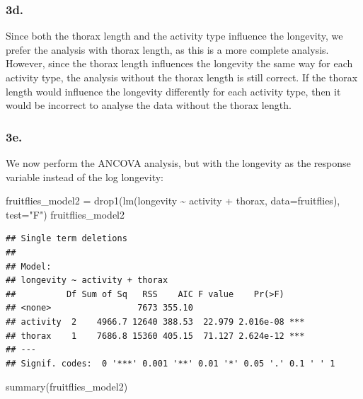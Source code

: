 \documentclass[
]{article}
\newenvironment{Shaded}{\begin{snugshade}}{\end{snugshade}}
\newcommand{\AttributeTok}[1]{\textcolor[rgb]{0.77,0.63,0.00}{#1}}
\newcommand{\FunctionTok}[1]{\textcolor[rgb]{0.00,0.00,0.00}{#1}}
\newcommand{\NormalTok}[1]{#1}
\newcommand{\OtherTok}[1]{\textcolor[rgb]{0.56,0.35,0.01}{#1}}
\newcommand{\SpecialCharTok}[1]{\textcolor[rgb]{0.00,0.00,0.00}{#1}}
\newcommand{\StringTok}[1]{\textcolor[rgb]{0.31,0.60,0.02}{#1}}
\begin{document}
\hypertarget{d.}{%
\subsubsection{3d.}\label{d.}}

Since both the thorax length and the activity type influence the
longevity, we prefer the analysis with thorax length, as this is a more
complete analysis. However, since the thorax length influences the
longevity the same way for each activity type, the analysis without the
thorax length is still correct. If the thorax length would influence the
longevity differently for each activity type, then it would be incorrect
to analyse the data without the thorax length.

\hypertarget{e.}{%
\subsubsection{3e.}\label{e.}}

We now perform the ANCOVA analysis, but with the longevity as the
response variable instead of the log longevity:

\begin{Shaded}
\begin{Highlighting}[]
\NormalTok{fruitflies\_model2 }\OtherTok{=} \FunctionTok{drop1}\NormalTok{(}\FunctionTok{lm}\NormalTok{(longevity }\SpecialCharTok{\textasciitilde{}}\NormalTok{ activity }\SpecialCharTok{+}\NormalTok{ thorax, }\AttributeTok{data=}\NormalTok{fruitflies), }\AttributeTok{test=}\StringTok{"F"}\NormalTok{)}
\NormalTok{fruitflies\_model2}
\end{Highlighting}
\end{Shaded}

\begin{verbatim}
## Single term deletions
## 
## Model:
## longevity ~ activity + thorax
##          Df Sum of Sq   RSS    AIC F value    Pr(>F)    
## <none>                 7673 355.10                      
## activity  2    4966.7 12640 388.53  22.979 2.016e-08 ***
## thorax    1    7686.8 15360 405.15  71.127 2.624e-12 ***
## ---
## Signif. codes:  0 '***' 0.001 '**' 0.01 '*' 0.05 '.' 0.1 ' ' 1
\end{verbatim}

\begin{Shaded}
\begin{Highlighting}[]
\FunctionTok{summary}\NormalTok{(fruitflies\_model2)}
\end{Highlighting}
\end{Shaded}
\end{document}
